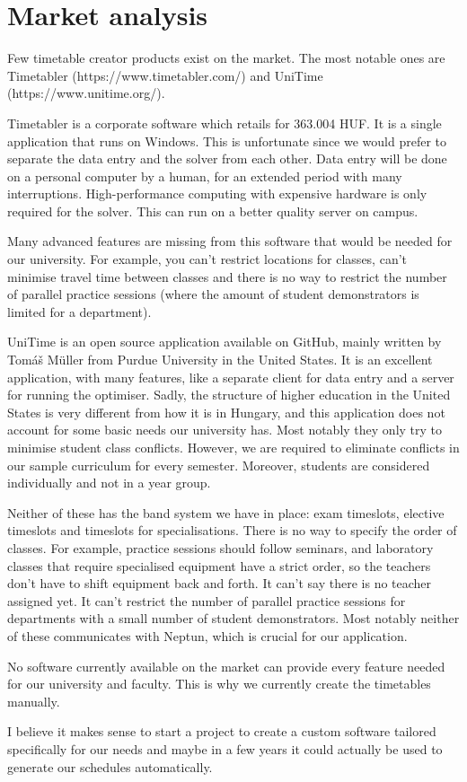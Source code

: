 \chapter{Market analysis}

Few timetable creator products exist on the market. The most notable ones are Timetabler (https://www.timetabler.com/) and UniTime (https://www.unitime.org/).

Timetabler is a corporate software which retails for 363.004 HUF. It is a single application that runs on Windows. This is unfortunate since we would prefer to separate the data entry and the solver from each other. Data entry will be done on a personal computer by a human, for an extended period with many interruptions. High-performance computing with expensive hardware is only required for the solver. This can run on a better quality server on campus.

Many advanced features are missing from this software that would be needed for our university. For example, you can't restrict locations for classes, can't minimise travel time between classes and there is no way to restrict the number of parallel practice sessions (where the amount of student demonstrators is limited for a department).

UniTime is an open source application available on GitHub, mainly written by Tomáš Müller from Purdue University in the United States. It is an excellent application, with many features, like a separate client for data entry and a server for running the optimiser. Sadly, the structure of higher education in the United States is very different from how it is in Hungary, and this application does not account for some basic needs our university has. Most notably they only try to minimise student class conflicts. However, we are required to eliminate conflicts in our sample curriculum for every semester. Moreover, students are considered individually and not in a year group.

Neither of these has the band system we have in place: exam timeslots, elective timeslots and timeslots for specialisations. There is no way to specify the order of classes. For example, practice sessions should follow seminars, and laboratory classes that require specialised equipment have a strict order, so the teachers don't have to shift equipment back and forth. It can't say there is no teacher assigned yet. It can't restrict the number of parallel practice sessions for departments with a small number of student demonstrators. Most notably neither of these communicates with Neptun, which is crucial for our application.

No software currently available on the market can provide every feature needed for our university and faculty. This is why we currently create the timetables manually.

I believe it makes sense to start a project to create a custom software tailored specifically for our needs and maybe in a few years it could actually be used to generate our schedules automatically.

